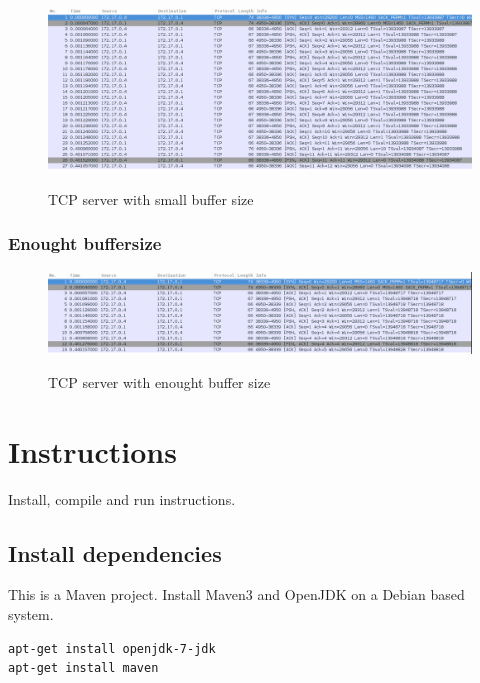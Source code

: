 \documentclass[a4paper,12pt]{article} %
\begin{document}
{\begin{figure}[H]
    \centering  
    \includegraphics[scale=0.34]{img/assignment14tcpSmallBuf.png}
	\label{fig:assignment14tcpSmallBuf}
	\caption{TCP server with small buffer size}
\end{figure}

\subsubsection{Enought buffersize}


\begin{figure}[H]
    \centering  
    \includegraphics[scale=0.35]{img/assignment14tcpOKBuf.png}
	\label{fig:assignment14tcpOKBuf}
	\caption{TCP server with enought buffer size}
\end{figure}


\clearpage

\section{Instructions}

Install, compile and run instructions.

\subsection{Install dependencies}

This is a Maven project.
Install Maven3 and OpenJDK on a Debian based system.

\begin{lstlisting}[language=bash]
apt-get install openjdk-7-jdk
apt-get install maven
\end{lstlisting}

}
\end{document}

